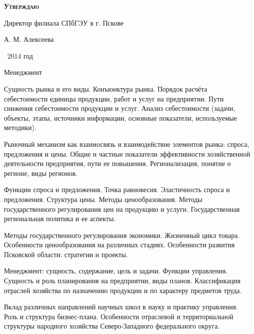\documentclass[
	11pt,
	a4paper,
	]
	{article}
\begin{document}
\newlength{\pblength}\settowidth{\pblength}{Директор филиала СПбГЭУ в г. Пскове}

\hfill\parbox{\pblength}{
	\textbf{\textsc{Утверждаю}}\medskip

	Директор филиала СПбГЭУ в г. Пскове\medskip

	\makebox[3cm]{\hrulefill} А. М. Алексеева\medskip

	\makebox[1.5cm]{<<\hrulefill>>} \makebox[3cm]{\hrulefill}\ 2014 год
}


 {Менеджмент}

	

\noindent{} 
	{
		Сущность рынка и его виды. Конъюнктура рынка.
	}{
		Порядок расчёта себестоимости единицы продукции, работ и услуг на предприятии. Пути снижения себестоимости продукции и услуг.
	}{
		Анализ себестоимости (задачи, объекты, этапы, источники информации, основные показатели, используемые методики).
	}

\bigskip

\noindent{} 
	{
		Рыночный механизм как взаимосвязь и взаимодействие элементов рынка: спроса, предложения и цены.
	}{
		Общие и частные показатели эффективности хозяйственной деятельности предприятия, пути ее повышения.
	}{
		Регионализация, понятие о регионе, виды регионов.
	}

\bigskip

\noindent{} 
	{
		Функции спроса и предложения. Точка равновесия. Эластичность спроса и предложения.
	}{
		Структура цены. Методы ценообразования. Методы государственного регулирования цен на продукцию и услуги.
	}{
		Государственная региональная политика и ее аспекты.
	}

\bigskip

\noindent{} 
	{
		Методы государственного регулирования экономики.
	}{
		Жизненный цикл товара. Особенности ценообразования на различных стадиях.
	}{
		Особенности развития Псковской области: стратегии и проекты.
	}

\bigskip

\noindent{} 
	{
		Менеджмент: сущность, содержание, цель и задачи. Функции управления.
	}{
		Сущность и роль планирования на предприятии, виды планов.
	}{
		Классификация отраслей хозяйства по назначению продукции и по характеру предметов труда.
	}

\bigskip

\noindent{} 
	{
		Вклад различных направлений научных школ в науку и практику управления.
	}{
		Роль и структура бизнес-плана.
	}{
		Особенности отраслевой и территориальной структуры народного хозяйства Северо-Западного федерального округа.
	}
\end{document}
